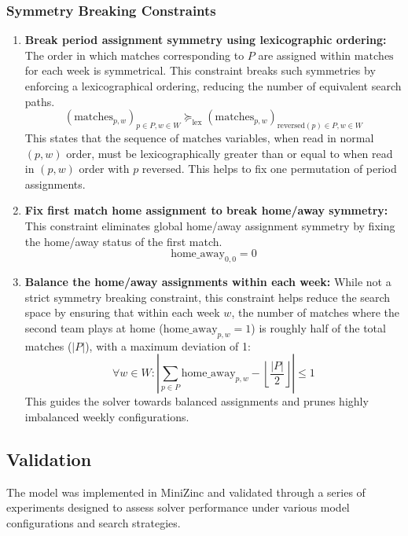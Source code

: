 \subsubsection{Symmetry Breaking Constraints}

\begin{enumerate}
    \item \textbf{Break period assignment symmetry using lexicographic ordering:} The order in which matches corresponding to $P$ are assigned within $\text{matches}$ for each week is symmetrical. This constraint breaks such symmetries by enforcing a lexicographical ordering, reducing the number of equivalent search paths.
    \[ (\text{matches}_{p, w})_{p \in P, w \in W} \succeq_{\text{lex}} (\text{matches}_{p, w})_{\text{reversed}(p) \in P, w \in W} \]
    This states that the sequence of $\text{matches}$ variables, when read in normal $(p,w)$ order, must be lexicographically greater than or equal to when read in $(p,w)$ order with $p$ reversed. This helps to fix one permutation of period assignments.

    \item \textbf{Fix first match home assignment to break home/away symmetry:} This constraint eliminates global home/away assignment symmetry by fixing the home/away status of the first match.
    \[ \text{home\_away}_{0, 0} = 0 \]

\item \textbf{Balance the home/away assignments within each week:} While not a strict symmetry breaking constraint, this constraint helps reduce the search space by ensuring that within each week $w$, the number of matches where the second team plays at home ($\text{home\_away}_{p, w}=1$) is roughly half of the total matches ($|P|$), with a maximum deviation of 1:
\[ \forall w \in W : \left| \sum_{p \in P} \text{home\_away}_{p, w} - \left\lfloor \frac{|P|}{2} \right\rfloor \right| \leq 1 \]
This guides the solver towards balanced assignments and prunes highly imbalanced weekly configurations.

\end{enumerate}

\subsection{Validation}

The model was implemented in MiniZinc and validated through a series of experiments designed to assess solver performance under various model configurations and search strategies.

